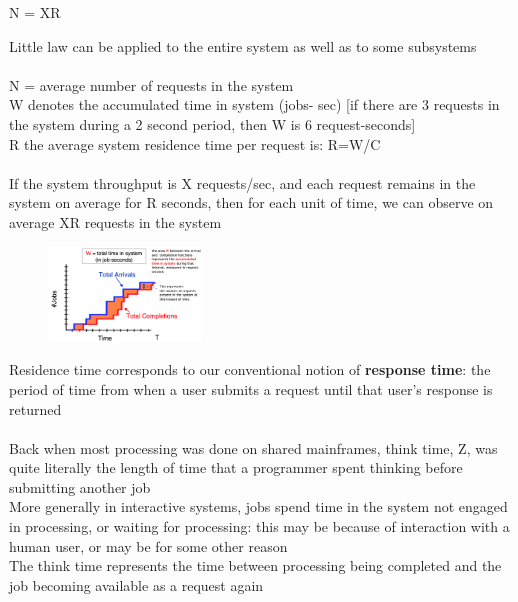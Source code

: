 \documentclass[10pt, oneside]{article}
\newcommand{\R}{\mathbb{R}}
\begin{document}
\begin{center}
    N = XR
\end{center}
\begin{multicols}{2}
Little law can be applied to the entire system as well as to some subsystems\\\\
N = average number of requests in the system\\W denotes the accumulated time in system (jobs- sec) [if there are 3 requests in the system during a 2 second period, then W is 6 request-seconds]\\R the average system residence time per request is: R=W/C\\\\
If the system throughput is X requests/sec, and each request remains in the system on average for R seconds, then for each unit of time, we can observe on average XR requests in the system
\columnbreak \begin{figure}[H]
    \begin{center}
        \includegraphics[width=0.36\textwidth]{img/img113.png}
        \end{center}
\end{figure}
\end{multicols}
Residence time corresponds to our conventional notion of {\bf response time}: the period of time from when a user submits a request until that user's response is returned\\\\
Back when most processing was done on shared mainframes, think time, Z, was quite literally the length of time that a programmer spent thinking before submitting another job\\ More generally in interactive systems, jobs spend time in the system not engaged in processing, or waiting for processing: this may be because of interaction with a human user, or may be for some other reason\\The think time represents the time between processing being completed and the job becoming available as a request again
\end{document}
